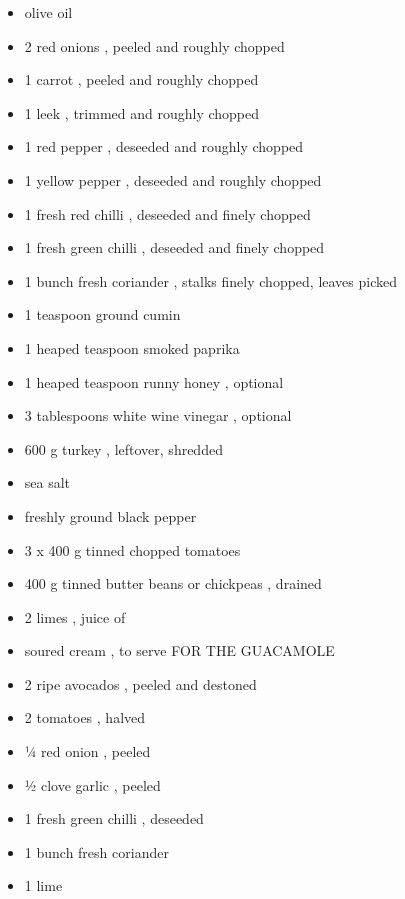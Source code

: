 \documentclass[
]{book}
\providecommand{\tightlist}{%
  \setlength{\itemsep}{0pt}\setlength{\parskip}{0pt}}
\begin{document}
\begin{itemize}
\tightlist
\item
  olive oil
\item
  2 red onions , peeled and roughly chopped
\item
  1 carrot , peeled and roughly chopped
\item
  1 leek , trimmed and roughly chopped
\item
  1 red pepper , deseeded and roughly chopped
\item
  1 yellow pepper , deseeded and roughly chopped
\item
  1 fresh red chilli , deseeded and finely chopped
\item
  1 fresh green chilli , deseeded and finely chopped
\item
  1 bunch fresh coriander , stalks finely chopped, leaves picked
\item
  1 teaspoon ground cumin
\item
  1 heaped teaspoon smoked paprika
\item
  1 heaped teaspoon runny honey , optional
\item
  3 tablespoons white wine vinegar , optional
\item
  600 g turkey , leftover, shredded
\item
  sea salt
\item
  freshly ground black pepper
\item
  3 x 400 g tinned chopped tomatoes
\item
  400 g tinned butter beans or chickpeas , drained
\item
  2 limes , juice of
\item
  soured cream , to serve
  FOR THE GUACAMOLE
\item
  2 ripe avocados , peeled and destoned
\item
  2 tomatoes , halved
\item
  ¼ red onion , peeled
\item
  ½ clove garlic , peeled
\item
  1 fresh green chilli , deseeded
\item
  1 bunch fresh coriander
\item
  1 lime
\end{itemize}
\end{document}
